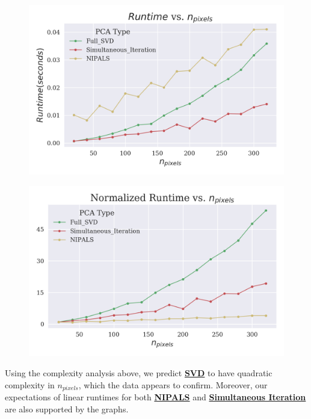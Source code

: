 \documentclass[12pt]{article}
\begin{document}
\begin{figure}[H]
\centering
\begin{minipage}{.45\textwidth}
  \centering
  \includegraphics[width=\linewidth]{U_Pixels.png}
  \label{UPixels}
\end{minipage}%
\quad
\begin{minipage}{.45\textwidth}
  \centering
  \includegraphics[width=\linewidth]{N_Pixels.png}
  \label{NPixels}
\end{minipage}
\end{figure}

Using the complexity analysis above, we predict \textbf{\hyperref[3.2]{SVD}} to have quadratic complexity in $n_{pixels}$, which the data appears to confirm. Moreover, our expectations of linear runtimes for both \textbf{\hyperref[3.1]{NIPALS}} and \textbf{\hyperref[3.3]{Simultaneous Iteration}} are also supported by the graphs. 
\end{document}
